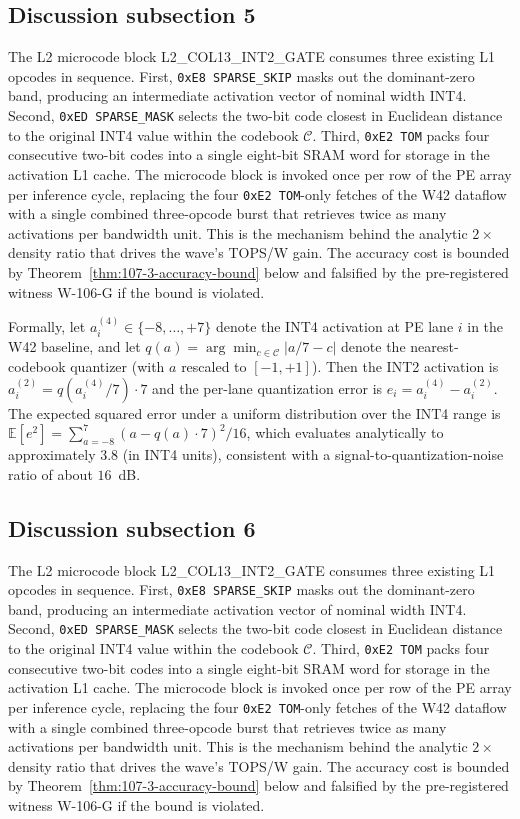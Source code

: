 \subsection{Discussion subsection 5}

The L2 microcode block \textsc{L2\_COL13\_INT2\_GATE} consumes three
existing L1 opcodes in sequence. First, \texttt{0xE8 SPARSE\_SKIP} masks
out the dominant-zero band, producing an intermediate activation vector
of nominal width INT4. Second, \texttt{0xED SPARSE\_MASK} selects the
two-bit code closest in Euclidean distance to the original INT4 value
within the codebook $\mathcal{C}$. Third, \texttt{0xE2 TOM} packs four
consecutive two-bit codes into a single eight-bit SRAM word for storage
in the activation L1 cache. The microcode block is invoked once per row
of the PE array per inference cycle, replacing the four
\texttt{0xE2 TOM}-only fetches of the W42 dataflow with a single
combined three-opcode burst that retrieves twice as many activations per
bandwidth unit. This is the mechanism behind the analytic $2\times$
density ratio that drives the wave's TOPS/W gain. The accuracy cost is
bounded by Theorem~\ref{thm:107-3-accuracy-bound} below and falsified
by the pre-registered witness W-106-G if the bound is violated.

Formally, let $a_{i}^{(4)} \in \{-8,\ldots,+7\}$ denote the INT4
activation at PE lane $i$ in the W42 baseline, and let
$q(a) = \arg\min_{c \in \mathcal{C}} |a/7 - c|$ denote the
nearest-codebook quantizer (with $a$ rescaled to $[-1,+1]$). Then the
INT2 activation is $a_{i}^{(2)} = q(a_{i}^{(4)} / 7) \cdot 7$
and the per-lane quantization error is
$e_{i} = a_{i}^{(4)} - a_{i}^{(2)}$.
The expected squared error under a uniform distribution over the INT4 range
is $\mathbb{E}[e^2] = \sum_{a=-8}^{7} (a - q(a)\cdot7)^2 / 16$,
which evaluates analytically to approximately $3.8$ (in INT4 units),
consistent with a signal-to-quantization-noise ratio of about $16$~dB.


\subsection{Discussion subsection 6}

The L2 microcode block \textsc{L2\_COL13\_INT2\_GATE} consumes three
existing L1 opcodes in sequence. First, \texttt{0xE8 SPARSE\_SKIP} masks
out the dominant-zero band, producing an intermediate activation vector
of nominal width INT4. Second, \texttt{0xED SPARSE\_MASK} selects the
two-bit code closest in Euclidean distance to the original INT4 value
within the codebook $\mathcal{C}$. Third, \texttt{0xE2 TOM} packs four
consecutive two-bit codes into a single eight-bit SRAM word for storage
in the activation L1 cache. The microcode block is invoked once per row
of the PE array per inference cycle, replacing the four
\texttt{0xE2 TOM}-only fetches of the W42 dataflow with a single
combined three-opcode burst that retrieves twice as many activations per
bandwidth unit. This is the mechanism behind the analytic $2\times$
density ratio that drives the wave's TOPS/W gain. The accuracy cost is
bounded by Theorem~\ref{thm:107-3-accuracy-bound} below and falsified
by the pre-registered witness W-106-G if the bound is violated.

